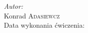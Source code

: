 \begin{titlepage}
\flushright
\Large \emph{Autor:}\\
Konrad \textsc{Adasiewcz}\\[2cm] %

Data wykonania ćwiczenia: \\
{\large {}}\\[1cm]


\vfill %

\end{titlepage}